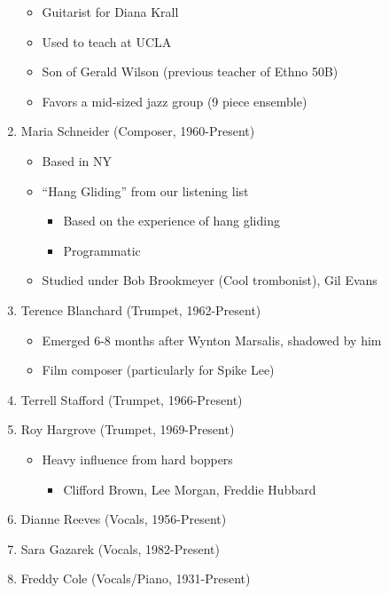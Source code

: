 \documentclass[]{article}
\providecommand{\tightlist}{%
  \setlength{\itemsep}{0pt}\setlength{\parskip}{0pt}}
\begin{document}
\begin{enumerate}
  \begin{itemize}
  \tightlist
  \item
    Guitarist for Diana Krall
  \item
    Used to teach at UCLA
  \item
    Son of Gerald Wilson (previous teacher of Ethno 50B)
  \item
    Favors a mid-sized jazz group (9 piece ensemble)
  \end{itemize}
\item
  Maria Schneider (Composer, 1960-Present)

  \begin{itemize}
  \tightlist
  \item
    Based in NY
  \item
    ``Hang Gliding'' from our listening list

    \begin{itemize}
    \tightlist
    \item
      Based on the experience of hang gliding
    \item
      Programmatic
    \end{itemize}
  \item
    Studied under Bob Brookmeyer (Cool trombonist), Gil Evans
  \end{itemize}
\item
  Terence Blanchard (Trumpet, 1962-Present)

  \begin{itemize}
  \tightlist
  \item
    Emerged 6-8 months after Wynton Marsalis, shadowed by him
  \item
    Film composer (particularly for Spike Lee)
  \end{itemize}
\item
  Terrell Stafford (Trumpet, 1966-Present)
\item
  Roy Hargrove (Trumpet, 1969-Present)

  \begin{itemize}
  \tightlist
  \item
    Heavy influence from hard boppers

    \begin{itemize}
    \tightlist
    \item
      Clifford Brown, Lee Morgan, Freddie Hubbard
    \end{itemize}
  \end{itemize}
\item
  Dianne Reeves (Vocals, 1956-Present)
\item
  Sara Gazarek (Vocals, 1982-Present)
\item
  Freddy Cole (Vocals/Piano, 1931-Present)


\end{enumerate}
\end{document}
